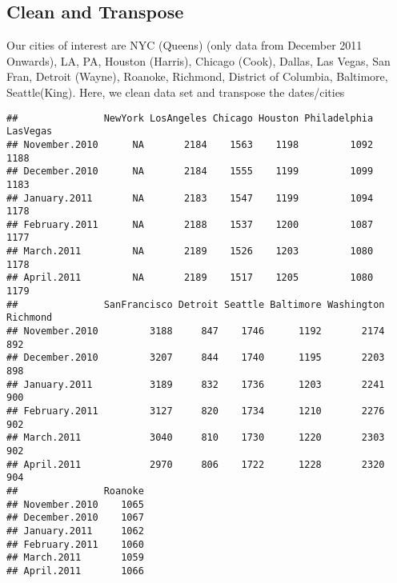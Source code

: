 \documentclass[
]{article}
\newenvironment{Shaded}{\begin{snugshade}}{\end{snugshade}}
\newcommand{\DecValTok}[1]{\textcolor[rgb]{0.00,0.00,0.81}{#1}}
\newcommand{\FunctionTok}[1]{\textcolor[rgb]{0.00,0.00,0.00}{#1}}
\newcommand{\NormalTok}[1]{#1}
\newcommand{\OtherTok}[1]{\textcolor[rgb]{0.56,0.35,0.01}{#1}}
\newcommand{\SpecialCharTok}[1]{\textcolor[rgb]{0.00,0.00,0.00}{#1}}
\newcommand{\StringTok}[1]{\textcolor[rgb]{0.31,0.60,0.02}{#1}}
\begin{document}
\hypertarget{clean-and-transpose}{%
\subsection{Clean and Transpose}\label{clean-and-transpose}}

Our cities of interest are NYC (Queens) (only data from December 2011
Onwards), LA, PA, Houston (Harris), Chicago (Cook), Dallas, Las Vegas,
San Fran, Detroit (Wayne), Roanoke, Richmond, District of Columbia,
Baltimore, Seattle(King). Here, we clean data set and transpose the
dates/cities

\begin{Shaded}
\end{Shaded}

\begin{verbatim}
##               NewYork LosAngeles Chicago Houston Philadelphia LasVegas
## November.2010      NA       2184    1563    1198         1092     1188
## December.2010      NA       2184    1555    1199         1099     1183
## January.2011       NA       2183    1547    1199         1094     1178
## February.2011      NA       2188    1537    1200         1087     1177
## March.2011         NA       2189    1526    1203         1080     1178
## April.2011         NA       2189    1517    1205         1080     1179
##               SanFrancisco Detroit Seattle Baltimore Washington Richmond
## November.2010         3188     847    1746      1192       2174      892
## December.2010         3207     844    1740      1195       2203      898
## January.2011          3189     832    1736      1203       2241      900
## February.2011         3127     820    1734      1210       2276      902
## March.2011            3040     810    1730      1220       2303      902
## April.2011            2970     806    1722      1228       2320      904
##               Roanoke
## November.2010    1065
## December.2010    1067
## January.2011     1062
## February.2011    1060
## March.2011       1059
## April.2011       1066
\end{verbatim}
\end{document}
